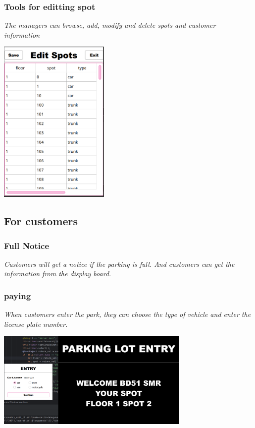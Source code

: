 {{{		\subsubsection{Tools for editting spot}
		{\slshape \selectfont
			 The managers can browse, add, modify and delete spots and customer information
			\begin{center}
				\centering
				\includegraphics[width=0.4\textwidth]{pics/Edit.png}
			\end{center}
		}
		\subsection{For customers}
		\subsubsection{Full Notice}
		{\slshape \selectfont
			 Customers will get a notice if the parking is full.
			And customers can get the information from the display board.
		}
		\newpage
		\subsubsection{paying}
		{\slshape \selectfont
			 When customers enter the park, they can choose the type of vehicle and enter the license plate number.
			\begin{center}
				\centering
				\includegraphics[width=0.7\textwidth]{pics/entry.png}
			\end{center}
		
}}}}

